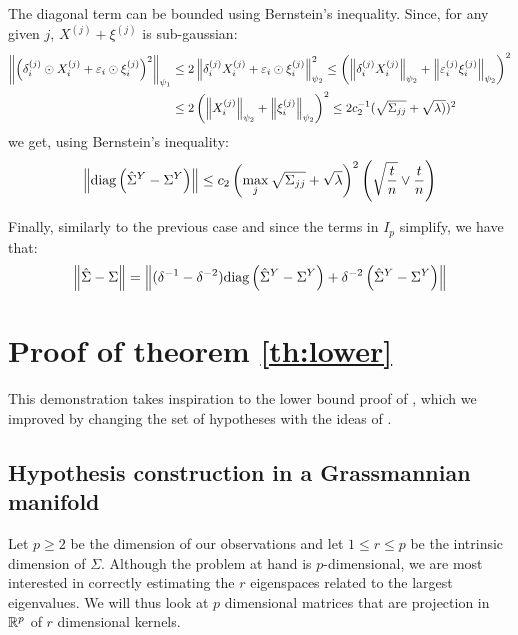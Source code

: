 \documentclass{article}
\numberwithin{equation}{section}
\numberwithin{equation}{section}
\begin{document}
        The diagonal term can be bounded using Bernstein's inequality. Since, for any given $j$, $X^{(j)} + \xi^{(j)}$ is sub-gaussian:
        \begin{equation}
            \begin{split}
            \left\Vert \left(\delta_i^{(j)}\odot X_i^{(j)} + \varepsilon_i \odot \xi_i^{(j)}\right)^2 \right\Vert_{\psi_{1}} & \leq 2 \left\Vert \delta_i^{(j)} X_i^{(j)}+ \varepsilon_i \odot \xi_i^{(j)} \right\Vert_{\psi_{2}}^2 \leq \left(\left\Vert \delta_i^{(j)} X_i^{(j)} \right\Vert_{\psi_{2}} + \left\Vert \varepsilon_i^{(j)} \xi_i^{(j)} \right\Vert_{\psi_{2}}\right)^2\\
            & \leq 2 \left( \left\Vert X_i^{(j)} \right\Vert_{\psi_{2}} + \left\Vert \xi_i^{(j)} \right\Vert_{\psi_{2}} \right)^2 \leq 2c_2^{-1} (\sqrt{\Sigma_{jj}} + \sqrt{\lambda)})^2
            \end{split}
        \end{equation}
        we get, using Bernstein's inequality:
        \begin{equation}
            \left\Vert \text{diag}\left(\hat{\Sigma}^Y - \Sigma^Y\right) \right\Vert \leq c_2 \left(\max_j \sqrt{\Sigma_{jj}} + \sqrt{\lambda} \right)^2 \left(\sqrt{\frac{t}{n}} \lor \frac{t}{n}\right)
        \end{equation}
        
        Finally, similarly to the previous case and since the terms in $I_p$ simplify, we have that:
        \begin{equation}
            \left\Vert \hat{\Sigma} - \Sigma \right\Vert = \left\Vert (\delta^{-1}-\delta^{-2})\text{diag} \left(\hat{\Sigma}^Y - \Sigma^Y\right) + \delta^{-2}\left(\hat{\Sigma}^Y - \Sigma^Y\right) \right\Vert
        \end{equation}
        
    \section{Proof of theorem \ref{th:lower}}
    \label{proof:lower_bound}
    
        This demonstration takes inspiration to the lower bound proof of \cite{louniciHighdimensionalCovarianceMatrix2014}, which we improved by changing the set of hypotheses with the ideas of \cite{koltchinskiiEstimationLowRankCovariance2015}.
        
        \subsection{Hypothesis construction in a Grassmannian manifold}
        
            Let $p\geq 2$ be the dimension of our observations and let $1\leq r \leq p$ be the intrinsic dimension of $\Sigma$. Although the problem at hand is $p$-dimensional, we are most interested in correctly estimating the $r$ eigenspaces related to the largest eigenvalues. We will thus look at $p$ dimensional matrices that are projection in $\mathbb{R}^p$ of $r$ dimensional kernels.
            
\end{document}
